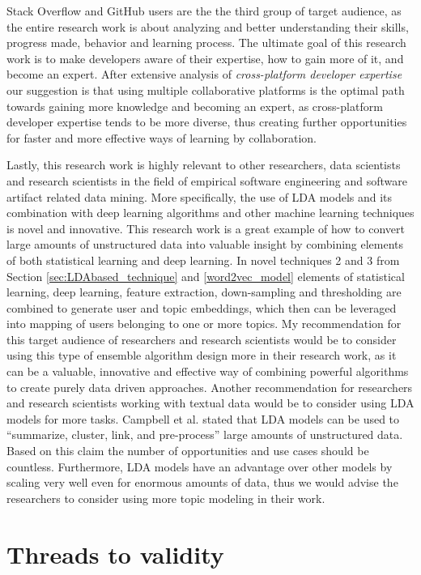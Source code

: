         Stack Overflow and GitHub users are the the third group of target audience, as the entire research work is about analyzing and better understanding their skills, progress made, behavior and learning process. The ultimate goal of this research work is to make developers aware of their expertise, how to gain more of it, and become an expert. After extensive analysis of \emph{cross-platform developer expertise} our suggestion is that using multiple collaborative platforms is the optimal path towards gaining more knowledge and becoming an expert, as cross-platform developer expertise tends to be more diverse, thus creating further opportunities for faster and more effective ways of learning by collaboration. 
        
        Lastly, this research work is highly relevant to other researchers, data scientists and research scientists in the field of empirical software engineering and software artifact related data mining. More specifically, the use of LDA models and its combination with deep learning algorithms and other machine learning techniques is novel and innovative. This research work is a great example of how to convert large amounts of unstructured data into valuable insight by combining elements of both statistical learning and deep learning. In novel techniques 2 and 3 from Section \ref{sec:LDAbased_technique} and \ref{word2vec_model} elements of statistical learning, deep learning, feature extraction, down-sampling and thresholding are combined to generate user and topic embeddings, which then can be leveraged into mapping of users belonging to one or more topics. My recommendation for this target audience of researchers and research scientists would be to consider using this type of ensemble algorithm design more in their research work, as it can be a valuable, innovative and effective way of combining powerful algorithms to create purely data driven approaches. Another recommendation for researchers and research scientists working with textual data would be to consider using LDA models for more tasks. Campbell et al. \cite{campbell2015latent} stated that LDA models can be used to ``summarize, cluster, link, and pre-process'' large amounts of unstructured data. Based on this claim the number of opportunities and use cases should be countless. Furthermore, LDA models have an advantage over other models by scaling very well even for enormous amounts of data, thus we would advise the researchers to consider using more topic modeling in their work.
        
    \section{Threads to validity\label{sec:validity}}
        
